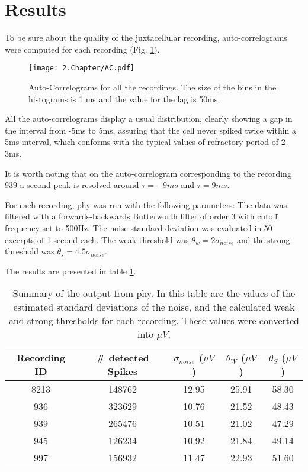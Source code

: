 
\section{Results}
\label{sec:chap2-results}
To be sure about the quality of the juxtacellular recording, auto-correlograms were computed for each recording (Fig. \ref{fig:AC}).
\begin{figure}[!h]
	\centering
	\texttt{[image: 2.Chapter/AC.pdf]}
	\caption{Auto-Correlograms for all the recordings. The size of the bins in the histograms is 1 ms and the value for the lag is 50ms.
}
\label{fig:AC}
\end{figure}

All the auto-correlograms display a usual distribution, clearly showing a gap in the interval from -5ms to 5ms, assuring that the cell never spiked twice  within a 5ms interval, which conforms with the typical values of refractory period of 2-3ms.

It is worth noting that on the auto-correlogram corresponding to the recording 939 a second peak is resolved around $\tau = -9 ms$ and $\tau = 9 ms$.

For each recording, phy was run with the following parameters:
The data was filtered with a forwards-backwards Butterworth filter of order 3 with cutoff frequency set to 500Hz. The noise standard deviation was evaluated in 50 excerpts of 1 second each. The weak threshold was $\theta_w = 2 \sigma_{noise}$ and the strong threshold was $\theta_s = 4.5 \sigma_{noise}$.

The results are presented in table \ref{tab:results-from-phy}.

\begin{table}[!h]

\begin{center}
\begin{tabular}{ccccc}
Recording ID & \# detected Spikes & $\sigma_{noise}$ ($\mu V$) & $\theta_W$ ($\mu V$) & $\theta_S$ ($\mu V$) \\ \hline
8213 & 148762 &  12.95 & 25.91 & 58.30 \\ 
936 & 323629 & 10.76 & 21.52 & 48.43 \\ 
939 & 265476 & 10.51 & 21.02 & 47.29 \\ 
945 & 126234 & 10.92 & 21.84 & 49.14 \\ 
997 & 156932 & 11.47 & 22.93 & 51.60 \\ 
\end{tabular}
\end{center}
\caption{Summary of the output from phy. In this table are the values of the estimated standard deviations of the noise, and the calculated weak and strong thresholds for each recording. These values were converted into $\mu V$.}
\label{tab:results-from-phy}
\end{table}

